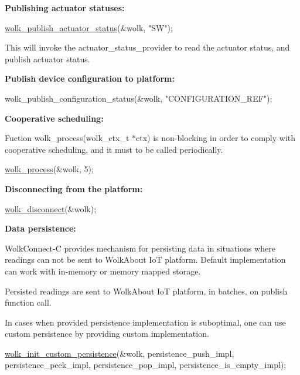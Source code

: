 {\bfseries Publishing actuator statuses\+:} 
\begin{DoxyCode}
\hyperlink{wolk__connector_8h_aa510c9f8df1d095d4e1aef9b7fdaf600}{wolk\_publish\_actuator\_status}(&wolk, \textcolor{stringliteral}{"SW"});
\end{DoxyCode}
 This will invoke the {\ttfamily actuator\+\_\+status\+\_\+provider} to read the actuator status, and publish actuator status.

{\bfseries Publish device configuration to platform\+:} 
\begin{DoxyCode}
wolk\_publish\_configuration\_status(&wolk, \textcolor{stringliteral}{"CONFIGURATION\_REF"});
\end{DoxyCode}


{\bfseries Cooperative scheduling\+:}

Fuction {\ttfamily wolk\+\_\+process(wolk\+\_\+ctx\+\_\+t $\ast$ctx)} is non-\/blocking in order to comply with cooperative scheduling, and it must to be called periodically.


\begin{DoxyCode}
\hyperlink{wolk__connector_8h_a57a05d76cc96bc5de0ee0e9a23ca5a8e}{wolk\_process}(&wolk, 5);
\end{DoxyCode}


{\bfseries Disconnecting from the platform\+:} 
\begin{DoxyCode}
\hyperlink{wolk__connector_8h_af174943365b8cddc1e6e9351996805c3}{wolk\_disconnect}(&wolk);
\end{DoxyCode}


{\bfseries Data persistence\+:}

Wolk\+Connect-\/C provides mechanism for persisting data in situations where readings can not be sent to Wolk\+About IoT platform. Default implementation can work with in-\/memory or memory mapped storage.

Persisted readings are sent to Wolk\+About IoT platform, in batches, on publish function call.

In cases when provided persistence implementation is suboptimal, one can use custom persistence by providing custom implementation.


\begin{DoxyCode}
\hyperlink{wolk__connector_8h_a4cb5cc0164b0ab19f9b2bf36d28e9913}{wolk\_init\_custom\_persistence}(&wolk,
                             persistence\_push\_impl,
                             persistence\_peek\_impl, persistence\_pop\_impl,
                             persistence\_is\_empty\_impl);
\end{DoxyCode}



